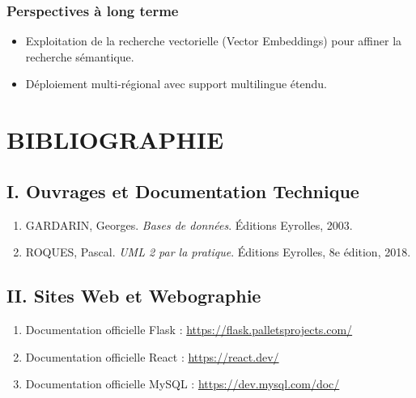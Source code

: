 \documentclass[12pt, a4paper, oneside]{report}
\begin{document}
\subsection{Perspectives à long terme}
\begin{itemize}
  \item Exploitation de la recherche vectorielle (Vector Embeddings) pour affiner la recherche sémantique.
  \item Déploiement multi-régional avec support multilingue étendu.
\end{itemize}

\chapter*{BIBLIOGRAPHIE}

\section*{I. Ouvrages et Documentation Technique}
\begin{enumerate}
  \item GARDARIN, Georges. \textit{Bases de données}. Éditions Eyrolles, 2003.
  \item ROQUES, Pascal. \textit{UML 2 par la pratique}. Éditions Eyrolles, 8e édition, 2018.
\end{enumerate}

\section*{II. Sites Web et Webographie}
\begin{enumerate}
  \item Documentation officielle Flask : \url{https://flask.palletsprojects.com/}
  \item Documentation officielle React : \url{https://react.dev/}
  \item Documentation officielle MySQL : \url{https://dev.mysql.com/doc/}
\end{enumerate}
\end{document}
